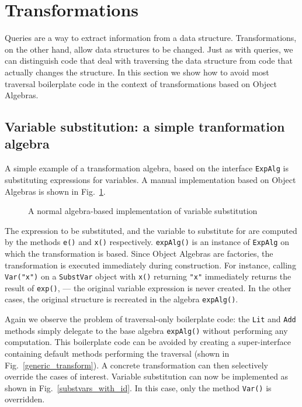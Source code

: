 \section{Transformations}\label{sec:transformations}
\label{retroimp}

Queries are a way to extract information from a data structure.
Transformations, on the other hand, allow data structures to be changed.
Just as with queries, we can distinguish code that deal with traversing the data structure from code that actually changes the structure.
In this section we show how to avoid most traversal boilerplate code in the context of transformations based on Object Algebras.


\subsection{Variable substitution: a simple tranformation algebra}\label{subsec:substvars}

A simple example of a transformation algebra, based on the interface \lstinline{ExpAlg} is substituting expressions for variables. A manual implementation based on Object Algebras is shown in Fig.~\ref{substvars_without_id}.

\begin{figure}[!htbp]
\vspace{-.1in}
\caption{A normal algebra-based implementation of variable substitution}
\label{substvars_without_id}
\end{figure}

The expression to be substituted, and the variable to substitute for are computed by the methods \lstinline{e()} and  \lstinline{x()} respectively.
\lstinline{expAlg()} is an instance of \lstinline{ExpAlg} on which the transformation is based.
Since Object Algebras are factories, the transformation is executed immediately during construction.
For instance, calling \lstinline{Var("x")} on a \lstinline{SubstVar} object with \lstinline{x()} returning \lstinline{"x"} immediately returns the result of \lstinline{exp()}, --- the original variable expression is never created.
In the other cases, the original structure is recreated in the algebra \lstinline{expAlg()}.

Again we observe the problem of traversal-only boilerplate code: the \lstinline{Lit} and \lstinline{Add} methods simply delegate to the base algebra \lstinline{expAlg()} without performing any computation.
This boilerplate code can be avoided by creating a super-interface containing default methods performing the traversal (shown in Fig.~\ref{generic_transform}).
A concrete transformation can then selectively override the cases of interest.
Variable substitution can now be implemented as shown in Fig.~\ref{substvars_with_id}.
In this case, only the  method \lstinline{Var()} is overridden.


